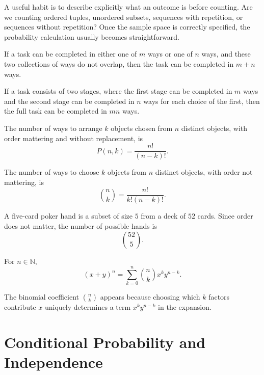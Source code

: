 A useful habit is to describe explicitly what an outcome is before counting. Are we counting ordered tuples, unordered subsets, sequences with repetition, or sequences without repetition? Once the sample space is correctly specified, the probability calculation usually becomes straightforward.

\begin{proposition}
If a task can be completed in either one of $m$ ways or one of $n$ ways, and these two collections of ways do not overlap, then the task can be completed in $m+n$ ways.
\end{proposition}

\begin{proposition}
If a task consists of two stages, where the first stage can be completed in $m$ ways and the second stage can be completed in $n$ ways for each choice of the first, then the full task can be completed in $mn$ ways.
\end{proposition}

\begin{definition}[Permutation]
The number of ways to arrange $k$ objects chosen from $n$ distinct objects, with order mattering and without replacement, is
\[
    P(n,k)=\frac{n!}{(n-k)!}.
\]
\end{definition}

\begin{definition}[Combination]
The number of ways to choose $k$ objects from $n$ distinct objects, with order not mattering, is
\[
    \binom{n}{k}=\frac{n!}{k!(n-k)!}.
\]
\end{definition}

\begin{example}
A five-card poker hand is a subset of size $5$ from a deck of $52$ cards. Since order does not matter, the number of possible hands is
\[
    \binom{52}{5}.
\]
\end{example}

\begin{theorem}
For $n\in\mathbb{N}$,
\[
    (x+y)^n=\sum_{k=0}^{n}\binom{n}{k}x^k y^{n-k}.
\]
\end{theorem}

\begin{remark}
The binomial coefficient $\binom{n}{k}$ appears because choosing which $k$ factors contribute $x$ uniquely determines a term $x^k y^{n-k}$ in the expansion.
\end{remark}

\section{Conditional Probability and Independence}


